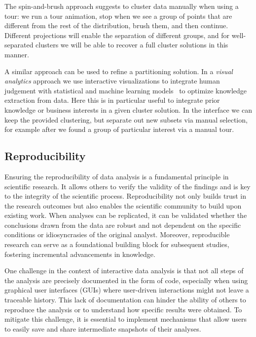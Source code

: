 \documentclass[article]{ajs}
\begin{document}
The spin-and-brush approach suggests to cluster data manually when using a tour: we run a tour animation, stop when we see a group of points that are different from the rest of the distribution, brush them, and then continue. Different projections will enable the separation of different groups, and for well-separated clusters we will be able to recover a full cluster solutions in this manner.

A similar approach can be used to refine a partitioning solution. In a \textit{visual analytics} approach we use interactive visualizations to integrate human judgement with statistical and machine learning models~\citep{keim2010mastering} to optimize knowledge extraction from data.
Here this is in particular useful to integrate prior knowledge or business interests in a given cluster solution. In the interface we can keep the provided clustering, but separate out new subsets via manual selection, for example after we found a group of particular interest via a manual tour.

\subsection{Reproducibility}

Ensuring the reproducibility of data analysis is a fundamental principle in scientific research. It allows others to verify the validity of the findings and is key to the integrity of the scientific process. Reproducibility not only builds trust in the research outcomes but also enables the scientific community to build upon existing work. When analyses can be replicated, it can be validated whether the conclusions drawn from the data are robust and not dependent on the specific conditions or idiosyncrasies of the original analyst. Moreover, reproducible research can serve as a foundational building block for subsequent studies, fostering incremental advancements in knowledge.

One challenge in the context of interactive data analysis is that not all steps of the analysis are precisely documented in the form of code, especially when using graphical user interfaces (GUIs) where user-driven interactions might not leave a traceable history. This lack of documentation can hinder the ability of others to reproduce the analysis or to understand how specific results were obtained. To mitigate this challenge, it is essential to implement mechanisms that allow users to easily save and share intermediate snapshots of their analyses.
\end{document}
